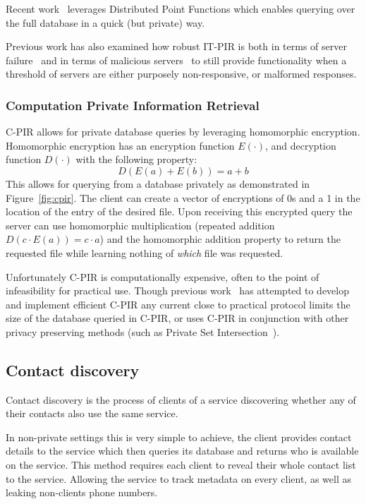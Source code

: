 Recent work~\cite{demmler2018pir} leverages Distributed Point Functions which
enables querying over the full database in a quick (but private) way.

Previous work has also examined how robust IT-PIR is both in terms of server
failure~\cite{beimel2002robust} and in terms of malicious
servers~\cite{devet2012optimally} to still provide functionality when a
threshold of servers are either purposely non-responsive, or malformed
responses.

\subsubsection{Computation Private Information Retrieval}
\computationalPIR

C-PIR allows for private database queries by leveraging homomorphic encryption. Homomorphic encryption has an encryption function $E(\cdot)$, and decryption function $D(\cdot)$ with the following property:
\[
    D(E(a) + E(b)) = a + b
\]
This allows for querying from a database privately as demonstrated in
Figure~\ref{fig:cpir}. The client can create a vector of encryptions of 0s and a
1 in the location of the entry of the desired file. Upon receiving this
encrypted query the server can use homomorphic multiplication (repeated addition
$D(c\cdot E(a)) = c\cdot a$) and the homomorphic addition property to return the
requested file while learning nothing of \textit{which} file was requested.

Unfortunately C-PIR is computationally expensive, often to the point of infeasibility for practical use. Though previous work~\cite{aguilar2016xpir,dong2014fast,gentry2005single} has attempted to develop and implement efficient C-PIR any current close to practical protocol limits the size of the database queried in C-PIR, or uses C-PIR in conjunction with other privacy preserving methods (such as Private Set Intersection~\cite{freedman2004efficient}).

\subsection{Contact discovery}\label{ssec:contactDiscovery}
Contact discovery is the process of clients of a service discovering whether any
of their contacts also use the same service.

In non-private settings this is very simple to achieve, the client provides
contact details to the service which then queries its database and returns who
is available on the service. This method requires each client to reveal their
whole contact list to the service. Allowing the service to track metadata on
every client, as well as leaking non-clients phone numbers.

